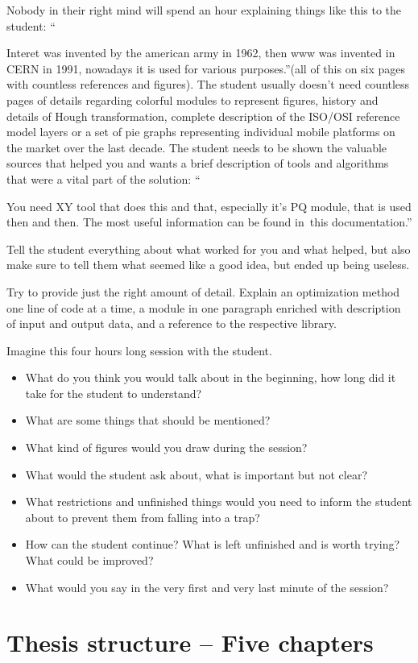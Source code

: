 Nobody in their right mind will spend an hour explaining things like this to the student: ``{\mbox{Interet} was invented by the american army in 1962, then www was invented in CERN in 1991, nowadays it is used for various purposes.''(all of this on six pages with countless references and figures).
The student usually doesn't need countless pages of details regarding colorful modules to represent figures, history and details of Hough transformation, complete description of the ISO/OSI reference model layers or a set of pie graphs representing individual mobile platforms on the market over the last decade.
The student needs to be shown the valuable sources that helped you and wants a brief description of tools and algorithms that were a vital part of the solution: ``{You need XY tool that does this and that, especially it's PQ module, that is used then and then. The most useful information can be found in~this documentation.''

Tell the student everything about what worked for you and what helped, but also make sure to tell them what seemed like a good idea, but ended up being useless.

Try to provide just the right amount of detail. Explain an optimization method one line of code at a time, a module in one paragraph enriched with description of input and output data, and a reference to the respective library.

Imagine this four hours long session with the student.
\begin{itemize}
  \item{What do you think you would talk about in the beginning, how long did it take for the student to understand?}
  \item{What are some things that should be mentioned?}
  \item{What kind of figures would you draw during the session?}
  \item{What would the student ask about, what is important but not clear?}
  \item{What restrictions and unfinished things would you need to inform the student about to prevent them from falling into a trap?}
  \item{How can the student continue? What is left unfinished and is worth trying? What could be improved?}
  \item{What would you say in the very first and very last minute of the session?}
\end{itemize}


\section{Thesis structure -- Five chapters}

}}
